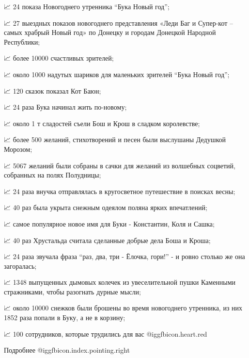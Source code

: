 📈 24 показа Новогоднего утренника \enquote{Бука Новый год};

📈 27 выездных показов новогоднего представления «Леди Баг и Супер-кот – самых
храбрый Новый год» по Донецку и городам Донецкой Народной Республики;

📈 более 10000 счастливых зрителей;

📈 около 1000 надутых шариков для маленьких зрителей \enquote{Бука Новый год};

📈 120 сказок показал Кот Баюн;

📈 24 раза Бука начинал жить по-новому;

📈 около 1 т сладостей съели Бош и Крош в сладком королевстве;

📈 более 500 желаний, стихотворений и песен были выслушаны Дедушкой Морозом;

📈 5067 желаний были собраны в сачки для желаний из волшебных соцветий,
собранных на полях Полудницы;

📈 24 раза внучка отправлялась в кругосветное путешествие в поисках весны;

📈 40 раз была укрыта снежным одеялом поляна ярких впечатлений;

📈 самое популярное новое имя для Буки - Константин, Коля и Сашка;

📈 40 раз Хрустальда считала сделанные добрые дела Боша и Кроша;

📈 24 раза звучала фраза \enquote{раз, два, три - Ёлочка, гори!} - и ровно столько же
она загоралась;

📈 1348 выпущенных дымовых колечек из увеселительной пушки Каменными
стражниками, чтобы разогнать дурные мысли;

📈 около 10000 снежков были брошены во время новогоднего утренника, из них 1852
раза попали в Буку, а не в корзину;

📈 100 сотрудников, которые трудились для вас @igg{fbicon.heart.red}

Подробнее  @igg{fbicon.index.pointing.right}  
